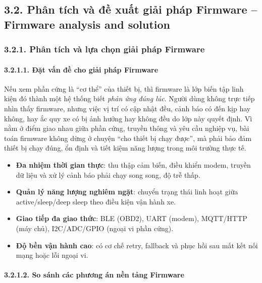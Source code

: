 \documentclass[a4paper]{extarticle}
\providecommand{\tightlist}{%
  \setlength{\itemsep}{0pt}\setlength{\parskip}{0pt}}
\begin{document}
\subsection{3.2. Phân tích và đề xuất giải pháp Firmware -- Firmware
analysis and solution}\label{32-ux111ux1ec1-xuux1ea5t-cuxe1c-giux1ea3i-phuxe1p--proposed-solutions}

\subsubsection{3.2.1. Phân tích và lựa chọn giải pháp Firmware}

\paragraph{3.2.1.1. Đặt vấn đề cho giải pháp
Firmware}\label{3121-ux111ux1eb7t-vux1ea5n-ux111ux1ec1-cho-giux1ea3i-phuxe1p-firmware}

Nếu xem phần cứng là ``cơ thể'' của thiết bị, thì firmware là lớp biến
tập linh kiện đó thành một hệ thống biết \emph{phản ứng đúng lúc}. Người
dùng không trực tiếp nhìn thấy firmware, nhưng việc vị trí có cập nhật
đều, cảnh báo có đến kịp hay không, hay ắc quy xe có bị ảnh hưởng hay
không đều do lớp này quyết định. Vì nằm ở điểm giao nhau giữa phần cứng,
truyền thông và yêu cầu nghiệp vụ, bài toán firmware không dừng ở chuyện
``cho thiết bị chạy được'', mà phải bảo đảm thiết bị chạy đúng, ổn định
và tiết kiệm năng lượng trong môi trường thực tế.

\begin{itemize}
\tightlist
\item
  \textbf{Đa nhiệm thời gian thực}: thu thập cảm biến, điều khiển modem,
  truyền dữ liệu và xử lý cảnh báo phải chạy song song, độ trễ thấp.
\item
  \textbf{Quản lý năng lượng nghiêm ngặt}: chuyển trạng thái linh hoạt
  giữa active/sleep/deep sleep theo điều kiện vận hành xe.
\item
  \textbf{Giao tiếp đa giao thức}: BLE (OBD2), UART (modem), MQTT/HTTP
  (máy chủ), I2C/ADC/GPIO (ngoại vi phần cứng).
\item
  \textbf{Độ bền vận hành cao}: có cơ chế retry, fallback và phục hồi
  sau mất kết nối mạng hoặc lỗi ngoại vi.
\end{itemize}

\paragraph{3.2.1.2. So sánh các phương án nền tảng
Firmware}\label{3122-so-suxe1nh-cuxe1c-phux1b0ux1a1ng-uxe1n-nux1ec1n-tux1ea3ng-firmware}
\end{document}
